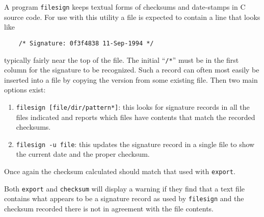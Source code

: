 A program {\tt filesign} keeps textual forms of checksums and date-stamps
in C source code.  For use with this utility a file is expected to
contain a line that looks like
\begin{verbatim}
    /* Signature: 0f3f4838 11-Sep-1994 */
\end{verbatim}
\noindent typically fairly near the top of the file.  The initial
``{\tt /*}'' must be in the first column for the signature to be
recognized. Such a record can
often most easily be inserted into a file by copying the version from some
existing file.  Then two main options exist:
\begin{enumerate}
\item{\tt filesign [file/dir/pattern*]}: this looks for signature records
in all the files indicated and reports which files have contents that
match the recorded checksums.
\item{\tt filesign -u file}: this updates the signature record in a single
file to show the current date and the proper checksum.
\end{enumerate}
\noindent Once again the checksum calculated should match that used
with {\tt export}.

Both {\tt export} and {\tt checksum} will display
a warning if they find that a text file contains what appears to be
a signature record as used by {\tt filesign} and the checksum recorded
there is not in agreement with the file contents.

